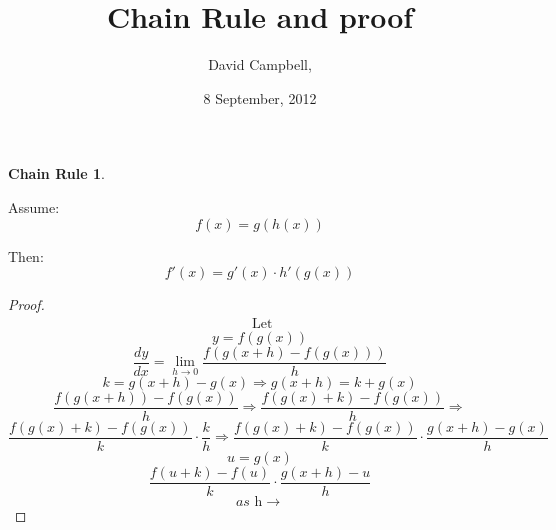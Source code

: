 \documentclass[12pt]{article}
\title{\textbf{Chain Rule and proof}}			%
\author{David Campbell, }		%
\date{8 September, 2012}					%
\numberwithin{equation}{section}
\theoremstyle{definition}
\newtheorem*{chrule}{Chain Rule}
\begin{document}
\maketitle						%
\begin{chrule}
\end{chrule}

Assume:
\begin{equation*}
f(x)=g(h(x))
\end{equation*}

Then:
\begin{equation*}
f\prime(x) = g\prime(x)\cdot{h}\prime(g(x))
\end{equation*}

\begin{proof}
\begin{multline*}
\mbox{   Let}
\end{multline*}
\begin{equation*}
y=f(g(x))
\end{equation*}
\begin{equation*}
\frac{dy}{dx}=\lim_{h \to 0}\frac{f(g(x+h)-f(g(x)))}{h}
\end{equation*}
\newline\newline
{}
\begin{equation*}
k=g(x+h)-g(x)\Rightarrow
g(x+h)=k+g(x)
\end{equation*}
\begin{equation*}
\frac{f(g(x+h))-f(g(x))}{h}\Rightarrow
\frac{f(g(x)+k)-f(g(x))}{h}\Rightarrow
\end{equation*}
\begin{equation*}
\frac{f(g(x)+k)-f(g(x))}{k}\cdot\frac{k}{h}\Rightarrow
\frac{f(g(x)+k)-f(g(x))}{k}\cdot\frac{g(x+h)-g(x)}{h}
\end{equation*}
\newline\newline
{}
\begin{equation*}
u=g(x)
\end{equation*}
\begin{equation*}
\frac{f(u+k)-f(u)}{k}\cdot\frac{g(x+h)-u}{h}
\end{equation*}
\newline\newline
{}
\newline
\begin{equation*}as\mbox{ h}\rightarrow

\end{equation*}
\end{proof}
\end{document}
